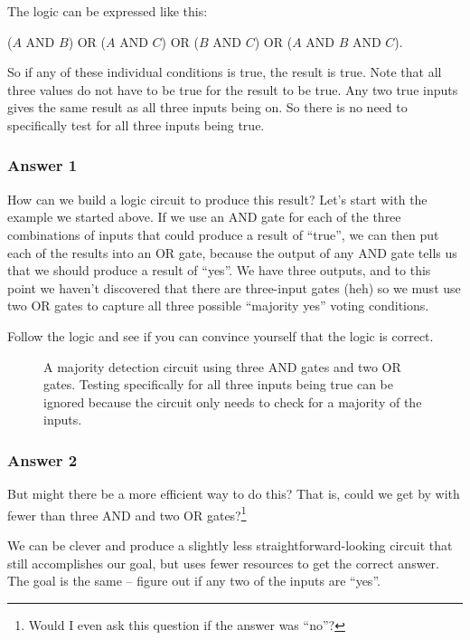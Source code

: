 The logic can be expressed like this: 

($A$ AND $B$) OR ($A$ AND $C$) OR ($B$ AND $C$) OR ($A$ AND $B$ AND $C$). 

So if any of these individual conditions is true, the result is true.
Note that all three values do not have to be true for the result to be true. Any two true inputs gives the same result as all three inputs being on. So there is no need to specifically test for all three inputs being true.


\clearpage
\subsubsection*{Answer 1}

How can we build a logic circuit to produce this result? Let's start with the example we started above. If we use an AND gate for each of the three combinations of inputs that could produce a result of ``true'', we can then put each of the results into an OR gate, because the output of any AND gate tells us that we should produce a result of ``yes''. We have three outputs, and to this point we haven't discovered that there are three-input gates (heh) so we must use two OR gates to capture all three possible ``majority yes'' voting conditions.

Follow the logic and see if you can convince yourself that the logic is correct.


\begin{figure}[hb!]
\begin{center}


\caption{A majority detection circuit using three AND gates and two OR gates. Testing specifically for all three inputs being true can be ignored because the circuit only needs to check for a majority of the inputs.}

\end{center}
\end{figure}

\clearpage

\subsubsection*{Answer 2}
But might there be a more efficient way to do this? That is, could we get by with fewer than three AND and two OR gates?\footnote{Would I even ask this question if the answer was ``no''?}

We can be clever and produce a slightly less straightforward-looking circuit that still accomplishes our goal, but uses fewer resources to get the correct answer. The goal is the same -- figure out if any two of the inputs are ``yes''. 

